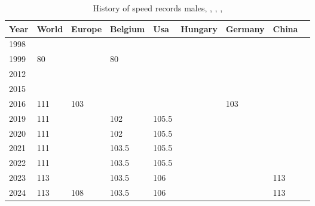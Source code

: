 \begin{table}[]
    \begin{tabular}{lllllllll}
        Year & World & Europe & Belgium & Usa   & Hungary & Germany & China \\ \hline
        1998 &       &        &         &       &         &         &       \\
        1999 & 80    &        & 80      &       &         &         &       \\
        2012 &       &        &         &       &         &         &       \\
        2015 &       &        &         &       &         &         &       \\
        2016 & 111   & 103    &         &       &         & 103     &       \\
        2019 & 111   &        & 102     & 105.5 &         &         &       \\
        2020 & 111   &        & 102     & 105.5 &         &         &       \\
        2021 & 111   &        & 103.5   & 105.5 &         &         &       \\
        2022 & 111   &        & 103.5   & 105.5 &         &         &       \\
        2023 & 113   &        & 103.5   & 106   &         &         & 113   \\
        2024 & 113   & 108    & 103.5   & 106   &         &         & 113
    \end{tabular}
    \caption[speed records males]{History of speed records males, \autocite{www_speed_30s_1999_WORLD}, \autocite{www_speed_30s_2024_BE}, \autocite{www_speed_30s_2024_IJRU_WORLD}, \autocite{www_speed_30s_2024_USA_AMJRF}}
    \label{tbl:speed-records-history-male}
\end{table}

